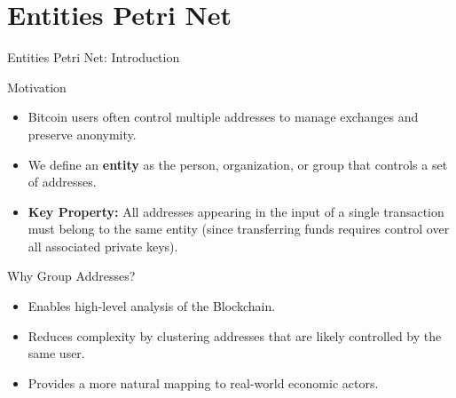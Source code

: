 \documentclass{beamer}
\begin{document}
\section{Entities Petri Net}

\begin{frame}{Entities Petri Net: Introduction}
    \footnotesize
    \begin{block}{Motivation}
        \begin{itemize}
            \item Bitcoin users often control multiple addresses to manage exchanges and preserve anonymity.
            \item We define an \textbf{entity} as the person, organization, or group that controls a set of addresses.
            \item \textbf{Key Property:} All addresses appearing in the input of a single transaction must belong to the same entity
                  (since transferring funds requires control over all associated private keys).
        \end{itemize}
    \end{block}

    \begin{block}{Why Group Addresses?}
        \begin{itemize}
            \item Enables high-level analysis of the Blockchain.
            \item Reduces complexity by clustering addresses that are likely controlled by the same user.
            \item Provides a more natural mapping to real-world economic actors.
        \end{itemize}
    \end{block}
\end{frame}
\end{document}
